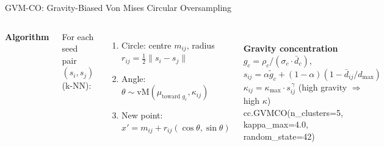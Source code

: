 \documentclass[aspectratio=169,10pt]{beamer}
\begin{document}
\begin{frame}[t]{GVM-CO: Gravity-Biased Von Mises Circular Oversampling}
\begin{columns}[T]
{\small\bfseries\color{myblue}Algorithm}\\[2pt]
{\footnotesize
For each seed pair $(s_i, s_j)$ (k-NN):
\begin{enumerate}\itemsep1pt
  \item Circle: centre $m_{ij}$, radius $r_{ij}=\tfrac{1}{2}\|s_i-s_j\|$
  \item Angle: $\theta\sim\mathrm{vM}(\mu_{\text{toward }g_c},\kappa_{ij})$
  \item New point: $x'=m_{ij}+r_{ij}(\cos\theta,\sin\theta)$
\end{enumerate}
}\\[3pt]
{\small\bfseries\color{myblue}Gravity concentration}\\[2pt]
{\footnotesize
$g_c = \rho_c/(\sigma_c\cdot\bar{d}_c)$,\quad
$s_{ij} = \alpha\tilde{g}_c + (1{-}\alpha)(1{-}\bar{d}_{ij}/d_\text{max})$\\[2pt]
$\kappa_{ij} = \kappa_\text{max}\cdot s_{ij}^{\,\gamma}$\quad
(high gravity $\Rightarrow$ high $\kappa$)
}\\[3pt]
{\scriptsize\ttfamily\color{myblue}
cc.GVMCO(n\_clusters=5,\\
\quad kappa\_max=4.0, random\_state=42)
}


\end{columns}
\end{frame}
\end{document}
